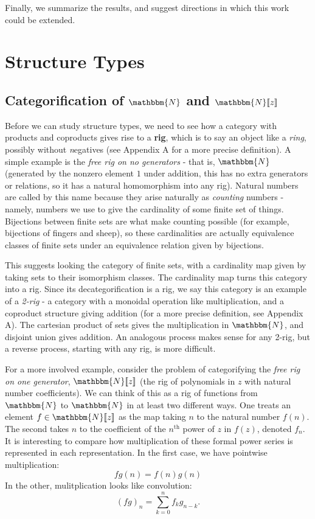 \documentclass{amsart} \usepackage{amsmath,amssymb,bbm}
\newcommand{\opname}[1]{\operatorname{#1}}
\begin{document}
Finally, we summarize the results, and suggest directions in which
this work could be extended.

\section{Structure Types\label{struct-type-sec}}

\subsection{Categorification of $\mathbbm{N}$ and $\mathbbm{N} [\![z]\!]$}

Before we can study structure types, we need to see how a category
with products and coproducts gives rise to a {\textbf{rig}}, which is
to say an object like a {\textit{ring}}, possibly without
{\textit{n}}egatives (see Appendix A for a more precise definition).
A simple example is the {\textit{free rig on no generators}} - that
is, $\mathbbm{N}$ (generated by the nonzero element $1$ under
addition, this has no extra generators or relations, so it has a
natural homomorphism into any rig).  Natural numbers are called by
this name because they arise naturally as {\textit{counting}} numbers
- namely, numbers we use to give the cardinality of some finite set of
things.  Bijections between finite sets are what make counting
possible (for example, bijections of fingers and sheep), so these
cardinalities are actually equivalence classes of finite sets under an
equivalence relation given by bijections.

This suggests looking the category of finite sets, with a cardinality
map given by taking sets to their isomorphism classes.  The
cardinality map turns this category into a rig.  Since its
decategorification is a rig, we say this category is an example of a
{\textit{2-rig}} - a category with a monoidal operation like
multiplication, and a coproduct structure giving addition (for a more
precise definition, see Appendix A).  The cartesian product of sets
gives the multiplication in $\mathbbm{N}$, and disjoint union gives
addition.  An analogous process makes sense for any 2-rig, but a
reverse process, starting with any rig, is more difficult.

For a more involved example, consider the problem of categorifying the
{\textit{free rig on one generator}}, $\mathbbm{N} [\![z]\!]$ (the rig
of polynomials in $z$ with natural number coefficients).  We can think
of this as a rig of functions from $\mathbbm{N}$ to $\mathbbm{N}$ in
at least two different ways.  One treats an element $f \in \mathbbm{N}
[\![z]\!]$ as the map taking $n$ to the natural number $f ( n )$.  The
second takes $n$ to the coefficient of the $n^{\opname{th}}$ power of
$z$ in $f ( z )$, denoted $f_n$.  It is interesting to compare how
multiplication of these formal power series is represented in each
representation.  In the first case, we have pointwise multiplication:
\[ f g ( n ) = f ( n ) g ( n ) \]
In the other, mulitplication looks like convolution:
\begin{equation}
  ( f g )_n = \sum_{k = 0}^n f_k g_{n - k} . \label{seriesmult}
\end{equation}
\end{document}

